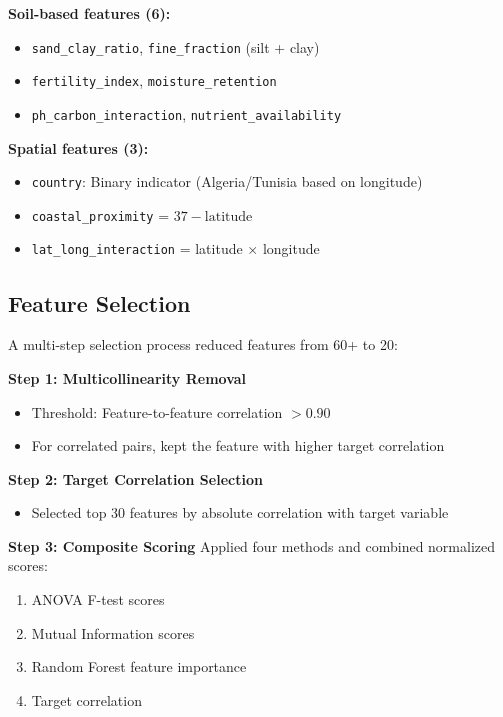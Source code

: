 \textbf{Soil-based features (6):}
\begin{itemize}
    \item \texttt{sand\_clay\_ratio}, \texttt{fine\_fraction} (silt + clay)
    \item \texttt{fertility\_index}, \texttt{moisture\_retention}
    \item \texttt{ph\_carbon\_interaction}, \texttt{nutrient\_availability}
\end{itemize}

\textbf{Spatial features (3):}
\begin{itemize}
    \item \texttt{country}: Binary indicator (Algeria/Tunisia based on longitude)
    \item \texttt{coastal\_proximity} = $37 - \text{latitude}$
    \item \texttt{lat\_long\_interaction} = latitude $\times$ longitude
\end{itemize}

\subsection{Feature Selection}
A multi-step selection process reduced features from 60+ to 20:

\textbf{Step 1: Multicollinearity Removal}
\begin{itemize}
    \item Threshold: Feature-to-feature correlation $> 0.90$
    \item For correlated pairs, kept the feature with higher target correlation
\end{itemize}

\textbf{Step 2: Target Correlation Selection}
\begin{itemize}
    \item Selected top 30 features by absolute correlation with target variable
\end{itemize}

\textbf{Step 3: Composite Scoring}
Applied four methods and combined normalized scores:
\begin{enumerate}
    \item ANOVA F-test scores
    \item Mutual Information scores
    \item Random Forest feature importance
    \item Target correlation
\end{enumerate}

